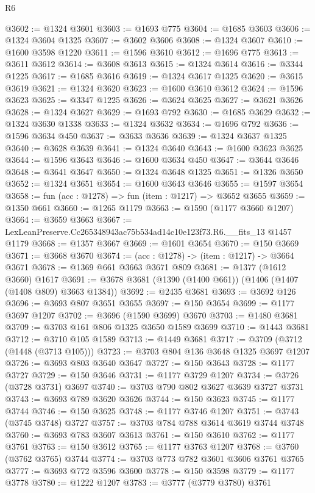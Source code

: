 \begin{lexlean}{R6}
\begin{coremodule}
@3602 := @1324 @3601
@3603 := @1693 @775
@3604 := @1685 @3603
@3606 := @1324 @3604 @1325
@3607 := @3602 @3606
@3608 := @1324 @3607
@3610 := @1600 @3598 @1220
@3611 := @1596 @3610
@3612 := @1696 @775
@3613 := @3611 @3612
@3614 := @3608 @3613
@3615 := @1324 @3614
@3616 := @3344 @1225
@3617 := @1685 @3616
@3619 := @1324 @3617 @1325
@3620 := @3615 @3619
@3621 := @1324 @3620
@3623 := @1600 @3610 @3612
@3624 := @1596 @3623
@3625 := @3347 @1225
@3626 := @3624 @3625
@3627 := @3621 @3626
@3628 := @1324 @3627
@3629 := @1693 @792
@3630 := @1685 @3629
@3632 := @1324 @3630 @1338
@3633 := @1324 @3632
@3634 := @1696 @792
@3636 := @1596 @3634 @450
@3637 := @3633 @3636
@3639 := @1324 @3637 @1325
@3640 := @3628 @3639
@3641 := @1324 @3640
@3643 := @1600 @3623 @3625
@3644 := @1596 @3643
@3646 := @1600 @3634 @450
@3647 := @3644 @3646
@3648 := @3641 @3647
@3650 := @1324 @3648 @1325
@3651 := @1326 @3650
@3652 := @1324 @3651
@3654 := @1600 @3643 @3646
@3655 := @1597 @3654
@3658 := fun (acc : @1278) => fun (item : @1217) => @3652 @3655
@3659 := @1350 @661
@3660 := @1265 @1179
@3663 := @1590 (@1177 @3660 @1207)
@3664 := @3659 @3663
@3667 := LexLeanPreserve.Cc265348943ac75b534ad14c10e123f73.R6.__fits_13 @1457 @1179
@3668 := @1357 @3667
@3669 := @1601 @3654
@3670 := @150 @3669
@3671 := @3668 @3670
@3674 := (acc : @1278) -> (item : @1217) -> @3664 @3671
@3678 := @1369 @661 @3663 @3671 @809
@3681 := @1377 (@1612 @3660) @1617
@3691 := @3678 @3681 (@1390 (@1400 @661)) (@1406 (@1407 (@1408 @809) @3663 @1384))
@3692 := @2435 @3681
@3693 := @3692 @126
@3696 := @3693 @807 @3651 @3655
@3697 := @150 @3654
@3699 := @1177 @3697 @1207
@3702 := @3696 (@1590 @3699) @3670
@3703 := @1480 @3681
@3709 := @3703 @161 @806 @1325 @3650 @1589 @3699
@3710 := @1443 @3681
@3712 := @3710 @105 @1589
@3713 := @1449 @3681
@3717 := @3709 (@3712 (@1448 (@3713 @105)))
@3723 := @3703 @804 @136 @3648 @1325 @3697 @1207
@3726 := @3693 @803 @3640 @3647
@3727 := @150 @3643
@3728 := @1177 @3727
@3729 := @150 @3646
@3731 := @1177 @3729 @1207
@3734 := @3726 (@3728 @3731) @3697
@3740 := @3703 @790 @802 @3627 @3639 @3727 @3731
@3743 := @3693 @789 @3620 @3626
@3744 := @150 @3623
@3745 := @1177 @3744
@3746 := @150 @3625
@3748 := @1177 @3746 @1207
@3751 := @3743 (@3745 @3748) @3727
@3757 := @3703 @784 @788 @3614 @3619 @3744 @3748
@3760 := @3693 @783 @3607 @3613
@3761 := @150 @3610
@3762 := @1177 @3761
@3763 := @150 @3612
@3765 := @1177 @3763 @1207
@3768 := @3760 (@3762 @3765) @3744
@3774 := @3703 @773 @782 @3601 @3606 @3761 @3765
@3777 := @3693 @772 @3596 @3600
@3778 := @150 @3598
@3779 := @1177 @3778
@3780 := @1222 @1207
@3783 := @3777 (@3779 @3780) @3761

\end{coremodule}
\end{lexlean}
